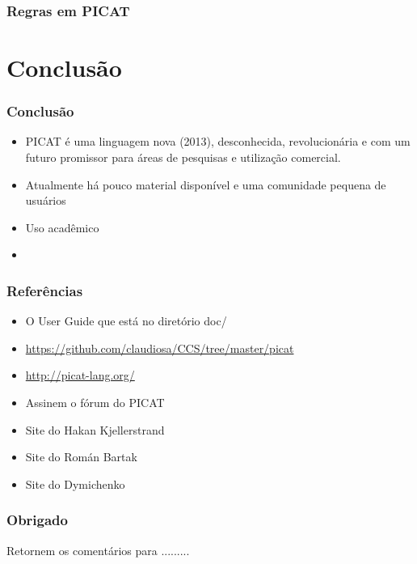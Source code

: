 \documentclass[10pt]{beamer}
\begin{document}
\begin{frame}[allowframebreaks=0.9]
 \frametitle{Regras em PICAT}



\end{frame}


\section{Conclusão}
\begin{frame}
    \frametitle{Conclusão}
    \begin{itemize}
    \item PICAT é uma linguagem nova (2013), desconhecida, revolucionária e com um futuro promissor para áreas de pesquisas e utilização comercial.
    \item Atualmente há pouco material disponível e uma comunidade pequena de usuários
    \item Uso acadêmico
    \item
    \end{itemize}
\end{frame}


\begin{frame}
    \frametitle{Referências}
    \begin{itemize}
    \item O User Guide que está no diretório  doc/
     \item \url{https://github.com/claudiosa/CCS/tree/master/picat}
     \item \url{http://picat-lang.org/}
    \item Assinem o fórum do PICAT

    \item Site do Hakan  Kjellerstrand 
    \item Site do Román Bartak
    \item Site do Dymichenko
    
    \end{itemize}
\end{frame}


\begin{frame}
    \frametitle{Obrigado}

 Retornem os comentários para .........


\end{frame}
\end{document}
